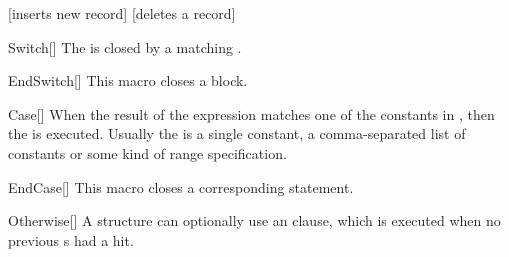 \documentclass[a4paper, 11pt]{article}
\begin{document}
\begin{tcblisting}{}
    \begin{algorithmic}
            [inserts new record]
            \EndCase
            [deletes a record]
            \EndCase
            \Otherwise
            \EndOtherwise
        \EndSwitch
    \end{algorithmic}
\end{tcblisting}


\begin{macro}{Switch}[]
    The  is closed by a matching .

    \BlockOptionsText
\end{macro}

\begin{macro}{EndSwitch}[]
    This macro closes a  block.

    \MacroOptionsText
\end{macro}

\begin{macro}{Case}[]
    When the result of the  expression matches one of the constants in , then the  is executed. Usually the  is a single constant, a comma-separated list of constants or some kind of range specification.

    \BlockOptionsText
\end{macro}

\begin{macro}{EndCase}[]
    This macro closes a corresponding  statement.

    \MacroOptionsText
\end{macro}

\begin{macro}{Otherwise}[]
    A  structure can optionally use an  clause, which is executed when no previous s had a hit.

    \BlockOptionsText
\end{macro}
\end{document}
